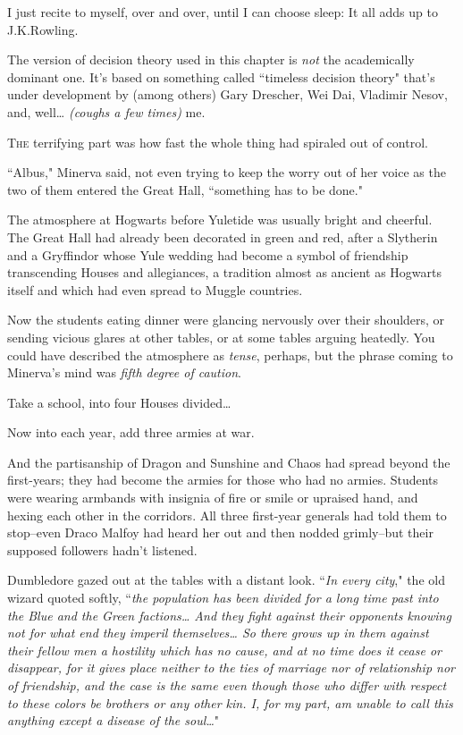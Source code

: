 
\begin{chapterOpeningAuthorNote}
I just recite to myself, over and over, until I can choose sleep: It all adds up to J.\?K.\?Rowling.

The version of decision theory used in this chapter is \emph{not} the academically dominant one. It's based on something called ``timeless decision theory" that's under development by (among others) Gary Drescher, Wei Dai, Vladimir Nesov, and, well{\ldots} \emph{(coughs a few times)} me.
\end{chapterOpeningAuthorNote}

\lettrine{T}{he} terrifying part was how fast the whole thing had spiraled out of control.

``Albus," Minerva said, not even trying to keep the worry out of her voice as the two of them entered the Great Hall, ``something has to be done."

The atmosphere at Hogwarts before Yuletide was usually bright and cheerful. The Great Hall had already been decorated in green and red, after a Slytherin and a Gryffindor whose Yule wedding had become a symbol of friendship transcending Houses and allegiances, a tradition almost as ancient as Hogwarts itself and which had even spread to Muggle countries.

Now the students eating dinner were glancing nervously over their shoulders, or sending vicious glares at other tables, or at some tables arguing heatedly. You could have described the atmosphere as \emph{tense}, perhaps, but the phrase coming to Minerva's mind was \emph{fifth degree of caution}.

Take a school, into four Houses divided{\ldots}

Now into each year, add three armies at war.

And the partisanship of Dragon and Sunshine and Chaos had spread beyond the first-years; they had become the armies for those who had no armies. Students were wearing armbands with insignia of fire or smile or upraised hand, and hexing each other in the corridors. All three first-year generals had told them to stop\---even Draco Malfoy had heard her out and then nodded grimly\---but their supposed followers hadn't listened.

Dumbledore gazed out at the tables with a distant look. ``\emph{In every city}," the old wizard quoted softly, ``\emph{the population has been divided for a long time past into the Blue and the Green factions{\ldots} And they fight against their opponents knowing not for what end they imperil themselves{\ldots} So there grows up in them against their fellow men a hostility which has no cause, and at no time does it cease or disappear, for it gives place neither to the ties of marriage nor of relationship nor of friendship, and the case is the same even though those who differ with respect to these colors be brothers or any other kin. I, for my part, am unable to call this anything except a disease of the soul{\ldots}}"

